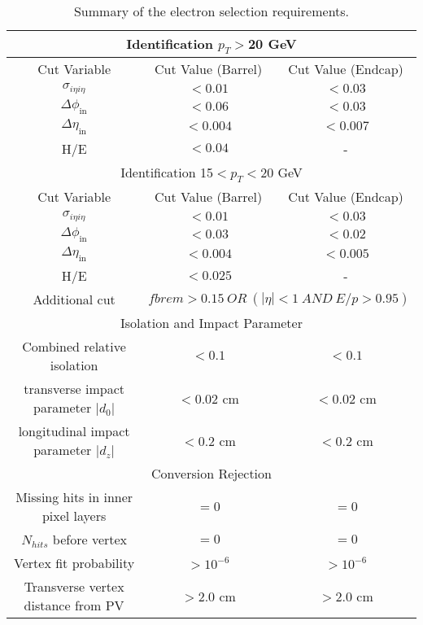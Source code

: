 \begin{table}[!ht]
\begin{center}
\begin{tabular}{|c|c|c|}
 \hline
 \multicolumn{3}{|c|}{Identification $p_T>$20 GeV} \\
\hline
 Cut Variable           &   Cut Value (Barrel)                   & Cut Value (Endcap)    \\
\hline
 $\sigma_{i\eta i\eta}$      &   $<0.01$                              & $<0.03$               \\ 
 $\Delta\phi_{\mathrm{in}}$  &   $<0.06$                              & $<0.03$               \\ 
 $\Delta\eta_{\mathrm{in}}$  &   $<0.004$                             & $<0.007$               \\ 
 H/E                         &  $<0.04$                          &   -          \\ 
 \hline
 \hline
 \multicolumn{3}{|c|}{Identification 15$<p_T<$20 GeV} \\
\hline
 Cut Variable           &   Cut Value (Barrel)                   & Cut Value (Endcap)    \\
\hline
 $\sigma_{i\eta i\eta}$      &   $<0.01$                              & $<0.03$               \\ 
 $\Delta\phi_{\mathrm{in}}$  &   $<0.03$                              & $<0.02$               \\ 
 $\Delta\eta_{\mathrm{in}}$  &   $<0.004$                             & $<0.005$               \\ 
 H/E                       &  $<0.025$                          &   -          \\ \hline
 Additional cut           &  \multicolumn{2}{|c|}{$fbrem>0.15~OR~(|\eta|<1~AND~E/p>0.95)$} \\ 
 \hline
 \hline
 \multicolumn{3}{|c|}{Isolation and Impact Parameter} \\
\hline
 Combined relative isolation &  $<0.1$                           &  $<0.1$              \\
 transverse impact parameter $|d_{0}|$  &  $<0.02$ cm   & $<0.02$ cm    \\
 longitudinal impact parameter $|d_{z}|$  &  $<0.2$ cm   & $<0.2$ cm    \\
 \hline
 \hline
 \multicolumn{3}{|c|}{Conversion Rejection} \\
 \hline
 Missing hits in inner pixel layers  &   $=0$      &  $=0$           \\ 
 $N_{hits}$ before vertex       &  $=0$    &   $=0$      \\  
 Vertex fit probability       &  $>10^{-6}$    &   $>10^{-6}$      \\  
 Transverse vertex distance from PV       &  $>2.0$ cm    &   $>2.0$ cm      \\  
 \hline

\hline
\end{tabular}
\caption{Summary of the electron selection requirements. \label{tab:electronSelection}}

\end{center}
\end{table}
